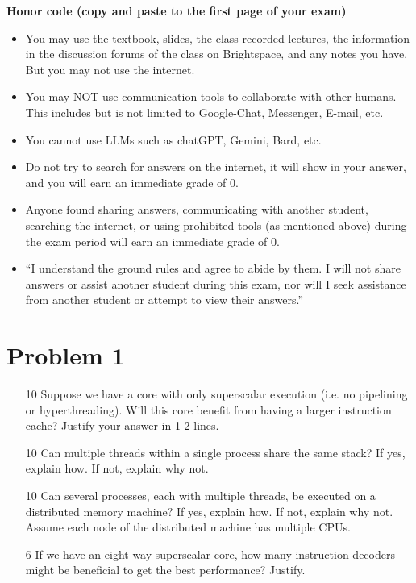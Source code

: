 \documentclass{article}
\begin{document}
\textbf{Honor code (copy and paste to the first page of your exam)}
\begin{itemize}
    \item You may use the textbook, slides, the class recorded lectures, the information in the discussion forums of the class on Brightspace, and any notes you have. But you may not use the internet.
    \item You may NOT use communication tools to collaborate with other humans. This includes but is not limited to Google-Chat, Messenger, E-mail, etc.
    \item You cannot use LLMs such as chatGPT, Gemini, Bard, etc.
    \item Do not try to search for answers on the internet, it will show in your answer, and you will earn an immediate grade of 0.
    \item Anyone found sharing answers, communicating with another student, searching the internet, or using prohibited tools (as mentioned above) during the exam period will earn an immediate grade of 0.
    \item “I understand the ground rules and agree to abide by them. I will not share answers or assist another student during this exam, nor will I seek assistance from another student or attempt to view their answers.”
\end{itemize}

\section*{Problem 1}
\begin{enumerate}
    \item [10]  Suppose we have a core with only superscalar execution (i.e. no pipelining or hyperthreading). Will this core benefit from having a larger instruction cache? Justify your answer in 1-2 lines.
    \item [10] Can multiple threads within a single process share the same stack? If yes, explain how. If not, explain why not.
    \item [10] Can several processes, each with multiple threads, be executed on a distributed memory machine? If yes, explain how. If not, explain why not.  Assume each node of the distributed machine has multiple CPUs.
    \item [6] If we have an eight-way superscalar core, how many instruction decoders might be beneficial to get the best performance? Justify.
\end{enumerate}
\end{document}
